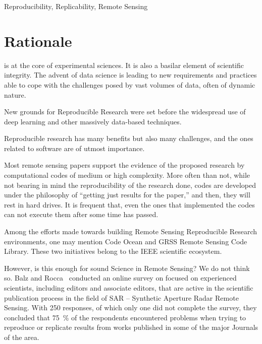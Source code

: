\documentclass[journal,twoside]{IEEEtran}
\begin{document}
\begin{IEEEkeywords}
	Reproducibility,
	Replicability,
	Remote Sensing
\end{IEEEkeywords}


\IEEEpeerreviewmaketitle

\section{Rationale}\label{Sec:Introduction}

 is at the core of experimental sciences. 
It is also a basilar element of scientific integrity. 
The advent of data science is leading to new requirements and practices able to cope with the challenges posed by vast volumes of data, often of dynamic nature. 

New grounds for Reproducible Research were set before the widespread use of deep learning and other massively data-based techniques.

Reproducible research has many benefits but also many challenges, and the ones related to software are of utmost importance.

Most remote sensing papers support the evidence of the proposed research by computational codes of medium or high complexity. 
More often than not, while not bearing in mind the reproducibility of the research done, codes are developed under the philosophy of ``getting just results for the paper,'' and then, they will rest in hard drives. 
It is frequent that, even the ones that implemented the codes can not execute them after some time has passed.  

Among the efforts made towards building Remote Sensing Reproducible Research environments, one may mention Code Ocean and GRSS Remote Sensing Code Library. 
These two initiatives belong to the IEEE scientific ecosystem. 

However, is this enough for sound Science in Remote Sensing? 
We do not think so. 
Balz and Rocca~\cite{ReproducibilityandReplicabilityinSARRemoteSensing} conducted an online survey on focused on experienced scientists, including editors
and associate editors, that are active
in the scientific publication process in the field of SAR -- Synthetic Aperture Radar Remote Sensing.
With \num{250} responses, of which only one did not complete the survey, they concluded that \SI{75}{\percent} of the respondents encountered problems when trying to reproduce or replicate results from works published in some of the major Journals of the area.
\end{document}
